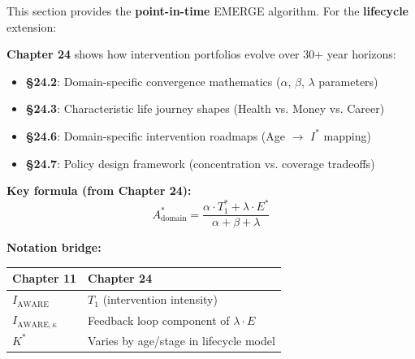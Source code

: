 \begin{tcolorbox}[colback=purple!5!white, colframe=purple!75!black,
    title=\textbf{Cross-Reference: Chapter 24 (Emergent Life Journeys)}]

This section provides the \textbf{point-in-time} EMERGE algorithm. For the \textbf{lifecycle} extension:

\textbf{Chapter 24} shows how intervention portfolios evolve over 30+ year horizons:
\begin{itemize}[nosep]
    \item \textbf{§24.2}: Domain-specific convergence mathematics ($\alpha$, $\beta$, $\lambda$ parameters)
    \item \textbf{§24.3}: Characteristic life journey shapes (Health vs. Money vs. Career)
    \item \textbf{§24.6}: Domain-specific intervention roadmaps (Age $\to$ $I^*$ mapping)
    \item \textbf{§24.7}: Policy design framework (concentration vs. coverage tradeoffs)
\end{itemize}

\textbf{Key formula (from Chapter 24):}
\begin{equation}
A^*_{\text{domain}} = \frac{\alpha \cdot T_1^* + \lambda \cdot E^*}{\alpha + \beta + \lambda}
\end{equation}

\textbf{Notation bridge:}
\begin{center}
\small
\begin{tabular}{@{}ll@{}}
Chapter 11 & Chapter 24 \\
\midrule
$I_{\text{AWARE}}$ & $T_1$ (intervention intensity) \\
$I_{\text{AWARE},\kappa}$ & Feedback loop component of $\lambda \cdot E$ \\
$K^*$ & Varies by age/stage in lifecycle model \\
\end{tabular}
\end{center}

\end{tcolorbox}

